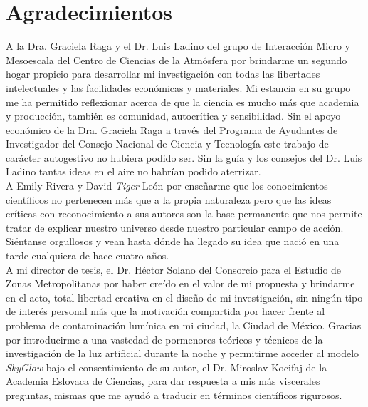 \chapter{Agradecimientos}

A la Dra. Graciela Raga y el Dr. Luis Ladino del grupo de Interacción Micro y Mesoescala del Centro de Ciencias de la Atmósfera por brindarme un segundo hogar propicio para desarrollar mi investigación con todas las libertades intelectuales y las facilidades económicas y materiales. Mi estancia en su grupo me ha permitido reflexionar acerca de que la ciencia es mucho más que academia y producción, también es comunidad, autocrítica y sensibilidad. Sin el apoyo económico de la Dra. Graciela Raga a través del Programa de Ayudantes de Investigador del Consejo Nacional de Ciencia y Tecnología este trabajo de carácter autogestivo no hubiera podido ser. Sin la guía y los consejos del Dr. Luis Ladino tantas ideas en el aire no habrían podido aterrizar.\\

A Emily Rivera y David \textit{Tiger} León por enseñarme que los conocimientos científicos no pertenecen más que a la propia naturaleza pero que las ideas críticas con reconocimiento a sus autores son la base permanente que nos permite tratar de explicar nuestro universo desde nuestro particular campo de acción. Siéntanse orgullosos y vean hasta dónde ha llegado su idea que nació en una tarde cualquiera de hace cuatro años.\\

A mi director de tesis, el Dr. Héctor Solano del Consorcio para el Estudio de Zonas Metropolitanas por haber creído en el valor de mi propuesta y brindarme en el acto, total libertad creativa en el diseño de mi investigación, sin ningún tipo de interés personal más que la motivación compartida por hacer frente al problema de contaminación lumínica en mi ciudad, la Ciudad de México. Gracias por introducirme a una vastedad de pormenores teóricos y técnicos de la investigación de la luz artificial durante la noche y permitirme acceder al modelo \textit{SkyGlow} bajo el consentimiento de su autor, el Dr. Miroslav Kocifaj de la Academia Eslovaca de Ciencias, para dar respuesta a mis más viscerales preguntas, mismas que me ayudó a traducir en términos científicos rigurosos.\\

